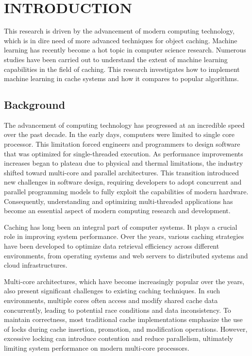 \chapter{INTRODUCTION}
\label{chap:intro}
This research is driven by the advancement of modern computing
technology, which is in dire need of more advanced techniques for
object caching. Machine learning has recently
become a hot topic in computer science research. Numerous
studies have been carried out to understand the extent of machine
learning capabilities in the field of caching. This
research investigates how to implement machine learning in cache
systems and how it compares to popular algorithms.

\section{Background}
\label{sec:background}

The advancement of computing technology has progressed at an
incredible speed over the past decade. In the early
days, computers were limited to single core processor.
This limitation forced engineers and
programmers to design software that was optimized for
single-threaded execution. As performance improvements increases began
to plateau due to physical and thermal
limitations, the industry shifted toward multi-core and
parallel architectures. This transition introduced new challenges in
software design, requiring developers to adopt concurrent and
parallel programming models to fully exploit the capabilities of
modern hardware. Consequently, understanding and optimizing
multi-threaded applications has become an essential aspect of modern
computing research and development.

Caching has long been an integral part of computer
systems. It plays a crucial role in improving system
performance. Over the years, various caching strategies have been
developed to optimize data retrieval efficiency across different
environments, from operating systems and web servers to
distributed systems and cloud infrastructures.

Multi-core architectures, which have become increasingly popular over
the years, also present significant challenges to existing caching
techniques. In such environments, multiple cores often access and
modify shared cache data concurrently, leading to potential race
conditions and data inconsistency. To maintain
correctness, most traditional cache implementations emphasize the use
of locks during cache insertion, promotion, and modification
operations. However, excessive locking can introduce
contention and reduce parallelism, ultimately limiting system
performance on modern multi-core processors.

